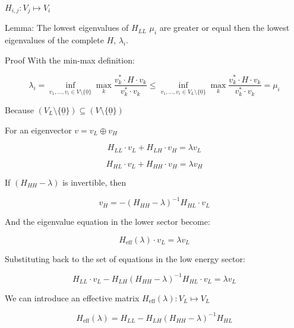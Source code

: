 \documentclass{article}
\theoremstyle{definition}
\begin{document}
$H_{i,j} : V_j \mapsto V_i$

Lemma:
The lowest eigenvalues of $H_{LL}$ $\mu_i$ are greater or equal then the lowest eigenvalues of the complete $H$, $\lambda_i$.

Proof
With the min-max definition:

\begin{equation}
    \lambda_i = \inf_{v_1,\dots,v_i \in V \setminus \{ \underline{0} \}} \max_{k}  \frac{v^*_k\cdot H \cdot v_k}{v^*_k\cdot v_k}
    \le
    \inf_{v_1,\dots,v_i \in V_L \setminus \{ \underline{0} \}} \max_{k}  \frac{v^*_k\cdot H \cdot v_k}{v^*_k\cdot v_k}
    =
    \mu_i
\end{equation}

Because $(V_L \setminus \{ \underline{0} \}) \subseteq (V \setminus \{ \underline{0} \})$

For an eigenvector $v=v_L \oplus v_H$

\begin{equation}
    H_{LL} \cdot v_L + H_{L H} \cdot v_H = \lambda v_L
\end{equation}

\begin{equation}
    H_{HL} \cdot v_L + H_{H H} \cdot v_H = \lambda v_H
\end{equation}

If $(H_{HH}-\lambda)$ is invertible, then

\begin{equation}
    v_H= -(H_{HH}-\lambda)^{-1} H_{HL} \cdot v_L 
\end{equation}

And the eigenvalue equation in the lower sector become:

\begin{equation}
    H_\text{eff} (\lambda) \cdot v_L = \lambda v_L
\end{equation}

Substituting back to the set of equations in the low energy sector:

\begin{equation}
    H_{LL} \cdot v_L - H_{L H} (H_{HH}-\lambda)^{-1} H_{HL} \cdot v_L  = \lambda v_L
\end{equation}

We can introduce an effective matrix $H_\text{eff}(\lambda):V_L\mapsto V_L$

\begin{equation}
    H_\text{eff}(\lambda) 
    =
    H_{LL} - H_{L H} (H_{HH}-\lambda)^{-1} H_{HL}
\end{equation}
\end{document}
